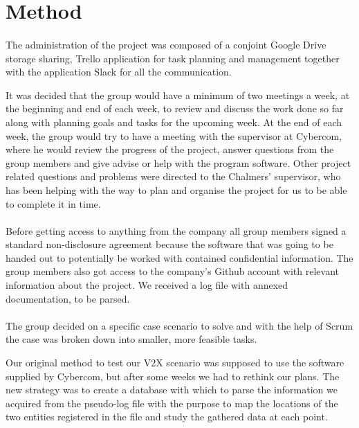 \section{Method}



\paragraph{}
The administration of the project was composed of a conjoint Google Drive storage sharing, Trello application for task planning and management together with the application Slack for all the communication.

It was decided that the group would have a minimum of two meetings a week, at the beginning and end of each week, to review and discuss the work done so far along with planning goals and tasks for the upcoming week. At the end of each week, the group would try to have a meeting with the supervisor at Cybercom, where he would review the progress of the project, answer questions from the group members and give advise or help with the program software. Other project related questions and problems were directed to the Chalmers' supervisor, who has been helping with the way to plan and organise the project for us to be able to complete it in time.

\paragraph{}
Before getting access to anything from the company all group members signed a standard non-disclosure agreement because the software that was going to be handed out to potentially be worked with contained confidential information. The group members also got access to the company's Github account with relevant information about the project. We received a log file with annexed documentation, to be parsed. 

\paragraph{}
The group decided on a specific case scenario to solve and with the help of Scrum the case was broken down into smaller, more feasible tasks. 

Our original method to test our V2X scenario was supposed to use the software supplied by Cybercom, but after some weeks we had to rethink our plans. The new strategy was to create a database with which to parse the information we acquired from the pseudo-log file with the purpose to map the locations of the two entities registered in the file and study the gathered data at each point. 
